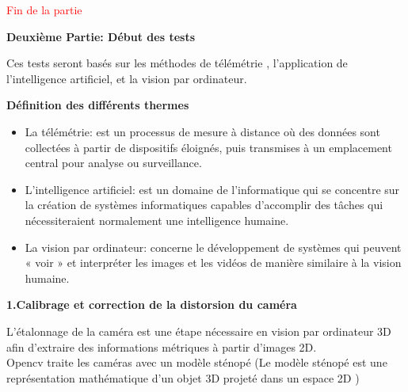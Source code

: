 \documentclass[12pt,a4paper]{report}
\begin{document}
 \textcolor{red}{Fin de la partie}\\




\newpage                        

\begin{center}
	\textbf{Deuxième Partie: Début des tests}
\end{center}


 Ces tests seront basés sur les méthodes de télémétrie , l'application de  l'intelligence artificiel, et la vision par ordinateur.
 \begin{center}
 	\textbf{Définition des différents thermes}
 \end{center}

\begin{itemize}
	\item La télémétrie: est un processus de mesure à distance où des données sont collectées à partir de dispositifs éloignés, puis transmises à un emplacement central pour analyse ou surveillance.\\
	
	\item L'intelligence artificiel: est un domaine de l'informatique qui se concentre sur la création de systèmes informatiques capables d'accomplir des tâches qui nécessiteraient normalement une intelligence humaine.\\
	
	\item La vision par ordinateur: concerne le développement de systèmes qui peuvent « voir » et interpréter les images et les vidéos de manière similaire à la vision humaine.
\end{itemize}


\begin{center}
	\textbf{1.Calibrage et correction de la distorsion du caméra}
\end{center}

L'étalonnage de la caméra est une étape nécessaire en vision par ordinateur 3D afin d'extraire des informations métriques à partir d'images 2D.\\

Opencv traite les caméras avec un modèle sténopé (Le modèle sténopé est une représentation mathématique d'un objet 3D projeté dans un espace 2D )\\
\end{document}
